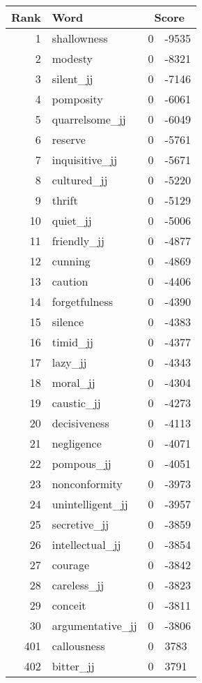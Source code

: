 \begin{longtable}[!htbp]{| rlr@{.}l |}
    \hline
    \textbf{Rank} & \textbf{Word} & \multicolumn{2}{c|}{\textbf{Score}} \\
    \hline
    \endhead
    1 & shallowness & 0 & -9535 \\
    2 & modesty & 0 & -8321 \\
    3 & silent\_jj & 0 & -7146 \\
    4 & pomposity & 0 & -6061 \\
    5 & quarrelsome\_jj & 0 & -6049 \\
    6 & reserve & 0 & -5761 \\
    7 & inquisitive\_jj & 0 & -5671 \\
    8 & cultured\_jj & 0 & -5220 \\
    9 & thrift & 0 & -5129 \\
    10 & quiet\_jj & 0 & -5006 \\
    11 & friendly\_jj & 0 & -4877 \\
    12 & cunning & 0 & -4869 \\
    13 & caution & 0 & -4406 \\
    14 & forgetfulness & 0 & -4390 \\
    15 & silence & 0 & -4383 \\
    16 & timid\_jj & 0 & -4377 \\
    17 & lazy\_jj & 0 & -4343 \\
    18 & moral\_jj & 0 & -4304 \\
    19 & caustic\_jj & 0 & -4273 \\
    20 & decisiveness & 0 & -4113 \\
    21 & negligence & 0 & -4071 \\
    22 & pompous\_jj & 0 & -4051 \\
    23 & nonconformity & 0 & -3973 \\
    24 & unintelligent\_jj & 0 & -3957 \\
    25 & secretive\_jj & 0 & -3859 \\
    26 & intellectual\_jj & 0 & -3854 \\
    27 & courage & 0 & -3842 \\
    28 & careless\_jj & 0 & -3823 \\
    29 & conceit & 0 & -3811 \\
    30 & argumentative\_jj & 0 & -3806 \\
    401 & callousness & 0 & 3783 \\
    402 & bitter\_jj & 0 & 3791 \\

\end{longtable}
